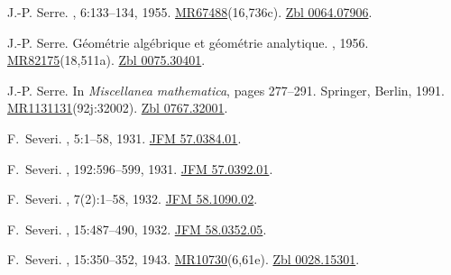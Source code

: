 \documentclass[11pt,a4paper, final, twoside]{article}
\numberwithin{equation}{section}
\begin{document}
\begin{appendices}
\begin{thebibliography}{100}
J.-P. Serre.
, 6:133--134,
  1955.
\newblock
  \href{http://www.ams.org/mathscinet-getitem?mr=67488}{MR67488}(16,736c).
  \href{http://zbmath.org/?q=an:0064.07906}{Zbl 0064.07906}.

J.-P. Serre.
\newblock G\'eom\'etrie alg\'ebrique et g\'eom\'etrie analytique.
, 1956.
\newblock
  \href{http://www.ams.org/mathscinet-getitem?mr=82175}{MR82175}(18,511a).
  \href{http://zbmath.org/?q=an:0075.30401}{Zbl 0075.30401}.

J.-P. Serre.
\newblock In {\em {Miscellanea mathematica}}, pages 277--291. Springer, Berlin,
  1991.
\newblock
  \href{http://www.ams.org/mathscinet-getitem?mr=1131131}{MR1131131}(92j:32002).
  \href{http://zbmath.org/?q=an:0767.32001}{Zbl 0767.32001}.

F.~Severi.
,
  5:1--58, 1931.
\newblock \href{http://zbmath.org/?q=an:57.0384.01}{JFM 57.0384.01}.

F.~Severi.
, 192:596--599, 1931.
\newblock \href{http://zbmath.org/?q=an:57.0392.01}{JFM 57.0392.01}.

F.~Severi.
, 7(2):1--58, 1932.
\newblock \href{http://zbmath.org/?q=an:58.1090.02}{JFM 58.1090.02}.

F.~Severi.
, 15:487--490, 1932.
\newblock \href{http://zbmath.org/?q=an:58.0352.05}{JFM 58.0352.05}.

F.~Severi.
, 15:350--352, 1943.
\newblock
  \href{http://www.ams.org/mathscinet-getitem?mr=10730}{MR10730}(6,61e).
  \href{http://zbmath.org/?q=an:0028.15301}{Zbl 0028.15301}.


\end{thebibliography}
\end{appendices}
\end{document}
